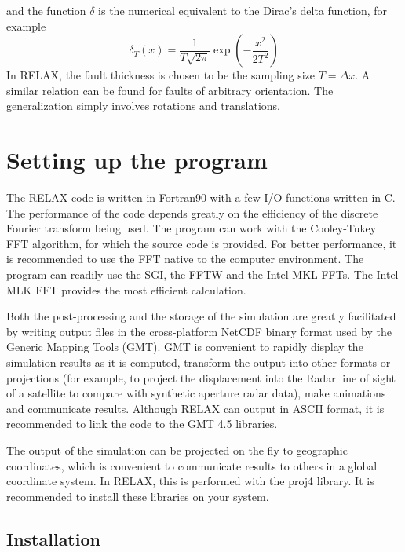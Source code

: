 \documentclass[10pt]{article}
\begin{document}
and the function $\delta$ is the numerical equivalent to the Dirac's delta function, for example
\begin{equation}
\delta_T(x)=\frac{1}{T\sqrt{2\pi}}\exp\!\left(-\frac{x^2}{2T^2}\right)
\end{equation}
In RELAX, the fault thickness is chosen to be the sampling size $T=\Delta x$. A similar relation can be found for faults of arbitrary orientation. The generalization simply involves rotations and translations. 

\section{Setting up the program}

The RELAX code is written in Fortran90 with a few I/O functions written in C. The performance of the code depends greatly on the efficiency of the discrete Fourier transform being used. The program can work with the Cooley-Tukey FFT algorithm, for which the source code is provided. For better performance, it is recommended to use the FFT native to the computer environment. The program can readily use the SGI, the FFTW and the Intel MKL FFTs. The Intel MLK FFT provides the most efficient calculation. 

Both the post-processing and the storage of the simulation are greatly facilitated by writing output files in the cross-platform NetCDF binary format used by the Generic Mapping Tools (GMT). GMT is convenient to rapidly display the simulation results as it is computed, transform the output into other formats or projections (for example, to project the displacement into the Radar line of sight of a satellite to compare with synthetic aperture radar data), make animations and communicate results. Although RELAX can output in ASCII format, it is recommended to link the code to the GMT 4.5 libraries. 

The output of the simulation can be projected on the fly to geographic coordinates, which is convenient to communicate results to others in a global coordinate system. In RELAX, this is performed with the proj4 library. It is recommended to install these libraries on your system.

\subsection{Installation}
\end{document}
